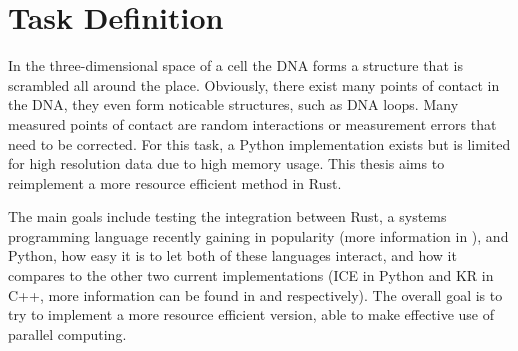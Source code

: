 %
%
%
%
%
%



\section{Task Definition}\label{sec:task}

In the three-dimensional space of a cell the DNA forms a structure that is
scrambled all around the place. Obviously, there exist many points of contact
in the DNA, they even form noticable structures, such as DNA loops. Many
measured points of contact are random interactions or measurement errors that
need to be corrected. For this task, a Python implementation exists but is
limited for high resolution data due to high memory usage. This thesis aims to
reimplement a more resource efficient method in Rust.

The main goals include testing the integration between Rust, a systems
programming language recently gaining in popularity (more information in
), and Python, how easy it is to let both of these languages
interact, and how it compares to the other two current implementations (ICE in
Python and KR in C++, more information can be found in  and
 respectively). The overall goal is to try to implement a more
resource efficient version, able to make effective use of parallel computing.

